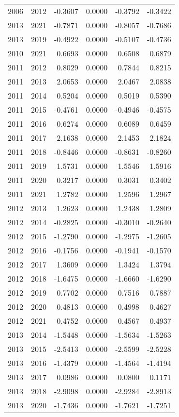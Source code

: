 \begin{tabular}{llrrrr}
2006 & 2012 & -0.3607 & 0.0000 & -0.3792 & -0.3422 \\
2013 & 2021 & -0.7871 & 0.0000 & -0.8057 & -0.7686 \\
2013 & 2019 & -0.4922 & 0.0000 & -0.5107 & -0.4736 \\
2010 & 2021 & 0.6693 & 0.0000 & 0.6508 & 0.6879 \\
2011 & 2012 & 0.8029 & 0.0000 & 0.7844 & 0.8215 \\
2011 & 2013 & 2.0653 & 0.0000 & 2.0467 & 2.0838 \\
2011 & 2014 & 0.5204 & 0.0000 & 0.5019 & 0.5390 \\
2011 & 2015 & -0.4761 & 0.0000 & -0.4946 & -0.4575 \\
2011 & 2016 & 0.6274 & 0.0000 & 0.6089 & 0.6459 \\
2011 & 2017 & 2.1638 & 0.0000 & 2.1453 & 2.1824 \\
2011 & 2018 & -0.8446 & 0.0000 & -0.8631 & -0.8260 \\
2011 & 2019 & 1.5731 & 0.0000 & 1.5546 & 1.5916 \\
2011 & 2020 & 0.3217 & 0.0000 & 0.3031 & 0.3402 \\
2011 & 2021 & 1.2782 & 0.0000 & 1.2596 & 1.2967 \\
2012 & 2013 & 1.2623 & 0.0000 & 1.2438 & 1.2809 \\
2012 & 2014 & -0.2825 & 0.0000 & -0.3010 & -0.2640 \\
2012 & 2015 & -1.2790 & 0.0000 & -1.2975 & -1.2605 \\
2012 & 2016 & -0.1756 & 0.0000 & -0.1941 & -0.1570 \\
2012 & 2017 & 1.3609 & 0.0000 & 1.3424 & 1.3794 \\
2012 & 2018 & -1.6475 & 0.0000 & -1.6660 & -1.6290 \\
2012 & 2019 & 0.7702 & 0.0000 & 0.7516 & 0.7887 \\
2012 & 2020 & -0.4813 & 0.0000 & -0.4998 & -0.4627 \\
2012 & 2021 & 0.4752 & 0.0000 & 0.4567 & 0.4937 \\
2013 & 2014 & -1.5448 & 0.0000 & -1.5634 & -1.5263 \\
2013 & 2015 & -2.5413 & 0.0000 & -2.5599 & -2.5228 \\
2013 & 2016 & -1.4379 & 0.0000 & -1.4564 & -1.4194 \\
2013 & 2017 & 0.0986 & 0.0000 & 0.0800 & 0.1171 \\
2013 & 2018 & -2.9098 & 0.0000 & -2.9284 & -2.8913 \\
2013 & 2020 & -1.7436 & 0.0000 & -1.7621 & -1.7251 \\

\end{tabular}
